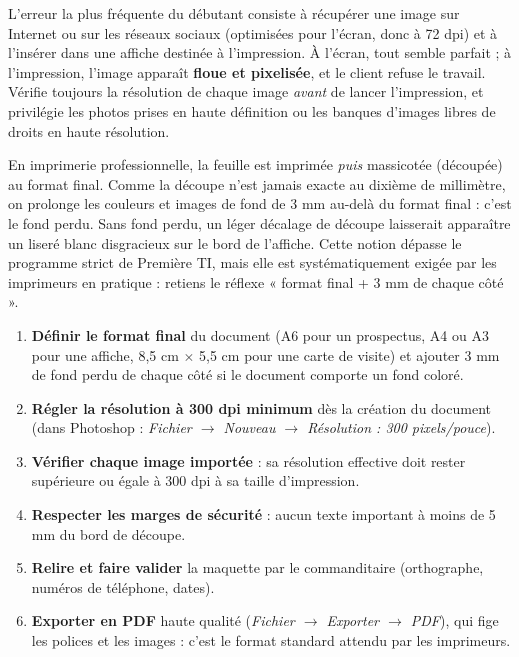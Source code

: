 \documentclass[11pt]{article}
\newcommand{\cle}[1]{{\popxbold\color{popdark}#1}}
\begin{document}
\begin{attention}
L'erreur la plus fréquente du débutant consiste à récupérer une image sur Internet ou sur les réseaux sociaux (optimisées pour l'écran, donc à 72 dpi) et à l'insérer dans une affiche destinée à l'impression. À l'écran, tout semble parfait ; à l'impression, l'image apparaît \textbf{floue et pixelisée}, et le client refuse le travail. Vérifie toujours la résolution de chaque image \emph{avant} de lancer l'impression, et privilégie les photos prises en haute définition ou les banques d'images libres de droits en haute résolution.
\end{attention}

\begin{savaistu}
En imprimerie professionnelle, la feuille est imprimée \emph{puis} massicotée (découpée) au format final. Comme la découpe n'est jamais exacte au dixième de millimètre, on prolonge les couleurs et images de fond de \cle{3 mm au-delà} du format final : c'est le \cle{fond perdu}. Sans fond perdu, un léger décalage de découpe laisserait apparaître un liseré blanc disgracieux sur le bord de l'affiche. Cette notion dépasse le programme strict de Première TI, mais elle est systématiquement exigée par les imprimeurs en pratique : retiens le réflexe « format final + 3 mm de chaque côté ».
\end{savaistu}

\begin{methode}
\begin{enumerate}
  \item \textbf{Définir le format final} du document (A6 pour un prospectus, A4 ou A3 pour une affiche, 8,5 cm $\times$ 5,5 cm pour une carte de visite) et ajouter 3 mm de fond perdu de chaque côté si le document comporte un fond coloré.
  \item \textbf{Régler la résolution à 300 dpi minimum} dès la création du document (dans Photoshop : \emph{Fichier $\to$ Nouveau $\to$ Résolution : 300 pixels/pouce}).
  \item \textbf{Vérifier chaque image importée} : sa résolution effective doit rester supérieure ou égale à 300 dpi à sa taille d'impression.
  \item \textbf{Respecter les marges de sécurité} : aucun texte important à moins de 5 mm du bord de découpe.
  \item \textbf{Relire et faire valider} la maquette par le commanditaire (orthographe, numéros de téléphone, dates).
  \item \textbf{Exporter en PDF} haute qualité (\emph{Fichier $\to$ Exporter $\to$ PDF}), qui fige les polices et les images : c'est le format standard attendu par les imprimeurs.
\end{enumerate}
\end{methode}
\end{document}
